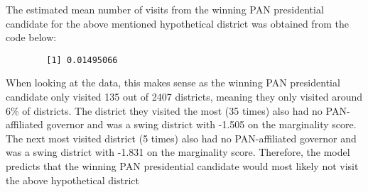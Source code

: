 \documentclass[12pt,letterpaper]{article}
\begin{document}
\begin{enumerate}
	\noindent The estimated mean number of visits from the winning PAN presidential candidate for the above mentioned hypothetical district was obtained from the code below:
	
	
	\begin{Verbatim}
		[1] 0.01495066
	\end{Verbatim}

	\noindent When looking at the data, this makes sense as the winning PAN presidential candidate only visited 135 out of 2407 districts, meaning they only visited around 6\% of districts. The district they visited the most (35 times) also had no PAN-affiliated governor and was a swing district with -1.505 on the marginality score. The next most visited district (5 times) also had no PAN-affiliated governor and was a swing district with -1.831 on the marginality score. Therefore, the model predicts that the winning PAN presidential candidate would most likely not visit the above hypothetical district
\end{enumerate}
\end{document}
